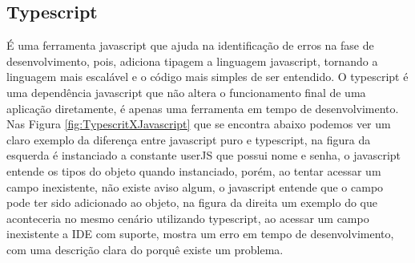 \documentclass{ufersa}
\begin{document}
\subsection{Typescript}
É uma ferramenta javascript que ajuda na identificação de erros na fase de desenvolvimento, pois,  adiciona tipagem a linguagem javascript, tornando a linguagem mais escalável e o código mais simples de ser entendido. O typescript é uma dependência javascript que não altera o funcionamento final de uma aplicação diretamente, é apenas uma ferramenta em tempo de desenvolvimento. Nas Figura \ref{fig:TypescritXJavascript}  que se encontra abaixo podemos ver um claro exemplo da diferença entre javascript puro e typescript, na figura da esquerda é instanciado a constante userJS que possui nome e senha, o javascript entende os tipos do objeto quando instanciado, porém, ao tentar acessar um campo inexistente, não existe aviso algum, o javascript entende que o campo pode ter sido adicionado ao objeto, na figura da direita um exemplo do que aconteceria no mesmo cenário utilizando typescript, ao acessar um campo inexistente a IDE com suporte, mostra um erro em tempo de desenvolvimento, com uma descrição clara do porquê existe um problema. 
\end{document}
